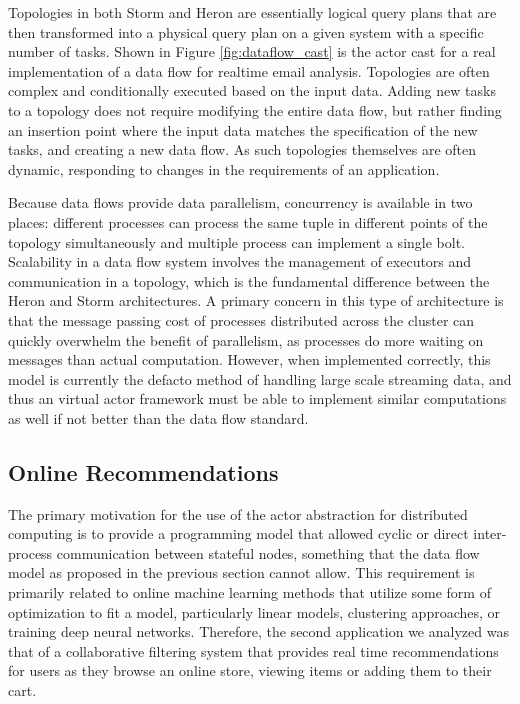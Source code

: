 \documentclass[conference,twocolumn,11pt]{IEEEtran}
\begin{document}
Topologies in both Storm and Heron are essentially logical query plans that are then transformed into a physical query plan on a given system with a specific number of tasks. Shown in Figure \ref{fig:dataflow_cast} is the actor cast for a real implementation of a data flow for realtime email analysis. Topologies are often complex and conditionally executed based on the input data. Adding new tasks to a topology does not require modifying the entire data flow, but rather finding an insertion point where the input data matches the specification of the new tasks, and creating a new data flow. As such topologies themselves are often dynamic, responding to changes in the requirements of an application.

Because data flows provide data parallelism, concurrency is available in two places: different processes can process the same tuple in different points of the topology simultaneously and multiple process can implement a single bolt. Scalability in a data flow system involves the management of executors and communication in a topology, which is the fundamental difference between the Heron and Storm architectures. A primary concern in this type of architecture is that the message passing cost of processes distributed across the cluster can quickly overwhelm the benefit of parallelism, as processes do more waiting on messages than actual computation. However, when implemented correctly, this model is currently the defacto method of handling large scale streaming data, and thus an virtual actor framework must be able to implement similar computations as well if not better than the data flow standard.

\subsection{Online Recommendations}

The primary motivation for the use of the actor abstraction for distributed computing is to provide a programming model that allowed cyclic or direct inter-process communication between stateful nodes, something that the data flow model as proposed in the previous section cannot allow. This requirement is primarily related to online machine learning methods that utilize some form of optimization to fit a model, particularly linear models, clustering approaches, or training deep neural networks. Therefore, the second application we analyzed was that of a collaborative filtering system that provides real time recommendations for users as they browse an online store, viewing items or adding them to their cart.
\end{document}
